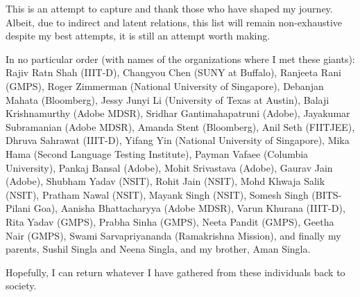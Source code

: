 \documentclass[PhD]{iiitd}
\begin{document}
This is an attempt to capture and thank those who have shaped my journey. Albeit, due to indirect and latent relations, this list will remain non-exhaustive despite my best attempts, it is still an attempt worth making.

In no particular order (with names of the organizations where I met these giants): Rajiv Ratn Shah (IIIT-D), Changyou Chen (SUNY at Buffalo), Ranjeeta Rani (GMPS), Roger Zimmerman (National University of Singapore), Debanjan Mahata (Bloomberg), Jessy Junyi Li (University of Texas at Austin), Balaji Krishnamurthy (Adobe MDSR), Sridhar Gantimahapatruni (Adobe), Jayakumar Subramanian (Adobe MDSR), Amanda Stent (Bloomberg), Anil Seth (FIITJEE), Dhruva Sahrawat (IIIT-D), Yifang Yin (National University of Singapore), Mika Hama (Second Language Testing Institute), Payman Vafaee (Columbia University), Pankaj Bansal (Adobe), Mohit Srivastava (Adobe), Gaurav Jain (Adobe), Shubham Yadav (NSIT), Rohit Jain (NSIT), Mohd Khwaja Salik (NSIT), Pratham Nawal (NSIT), Mayank Singh (NSIT), Somesh Singh (BITS-Pilani Goa), Aanisha Bhattacharyya (Adobe MDSR), Varun Khurana (IIIT-D), Rita Yadav (GMPS), Prabha Sinha (GMPS), Neeta Pandit (GMPS), Geetha Nair (GMPS), Swami Sarvapriyananda (Ramakrishna Mission), and finally my parents, Sushil Singla and Neena Singla, and my brother, Aman Singla.


Hopefully, I can return whatever I have gathered from these individuals back to society.
\clearpage



\clearpage

{\small
{}
\tableofcontents}
















\listoftables
{}
\listoffigures
%
\begin{singlespace}

\end{singlespace}
\end{document}
